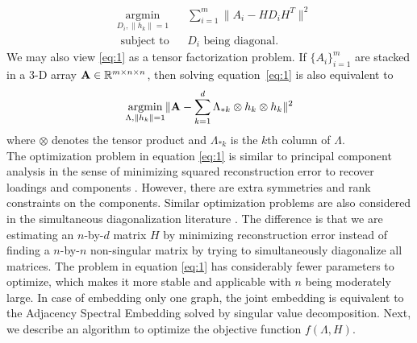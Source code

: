 \documentclass[10pt,journal,compsoc]{IEEEtran}
\begin{document}
 \begin{equation*}
\begin{aligned}  
	& \underset{D_i,\|h_k\|=1}{\operatorname{argmin}} 
	& & \sum\limits_{i=1}^{m} \| A_i- H D_i H^T \|  ^2 \\
	& \text{ subject to} 
	& &  D_i \text{ being diagonal.}
\end{aligned}
\end{equation*}
We may also view \eqref{eq:1} as a tensor factorization problem. If $\{A_i\}_{i=1}^m$ are stacked in a 3-D array ${\bf A} \in \mathbb{R}^{m\times n \times n}$, then solving equation~\eqref{eq:1} is also equivalent to
\[  \underset{\Lambda,\|h_k\|=1}{\operatorname{argmin}}  \| {\bf A} - \sum\limits_{k=1}^{d} \Lambda_{*k} \otimes h_k \otimes h_k\|  ^2  \]
where $\otimes$ denotes the tensor product and $\Lambda_{*k}$ is the $k$th column of $\Lambda$. \\

\noindent The optimization problem in equation \eqref{eq:1} is similar to principal component analysis in the sense of minimizing squared reconstruction error to recover loadings and components \cite{jolliffe2002principal}. However, there are extra symmetries and rank constraints on the components. Similar optimization problems are also considered in the simultaneous diagonalization literature \cite{flury1986algorithm} \cite{ziehe2004fast}. The difference is that we are estimating an $n$-by-$d$ matrix $H$ by minimizing reconstruction error instead of finding a $n$-by-$n$ non-singular matrix by trying to simultaneously diagonalize all matrices. The problem in equation \eqref{eq:1} has considerably fewer parameters to optimize, which makes it more stable and applicable with $n$ being moderately large. In case of embedding only one graph, the joint embedding is equivalent to the Adjacency Spectral Embedding solved by singular value decomposition\cite{sussman2012consistent}. Next, we describe an algorithm to optimize the objective function $f(\Lambda,H)$.  
\end{document}
